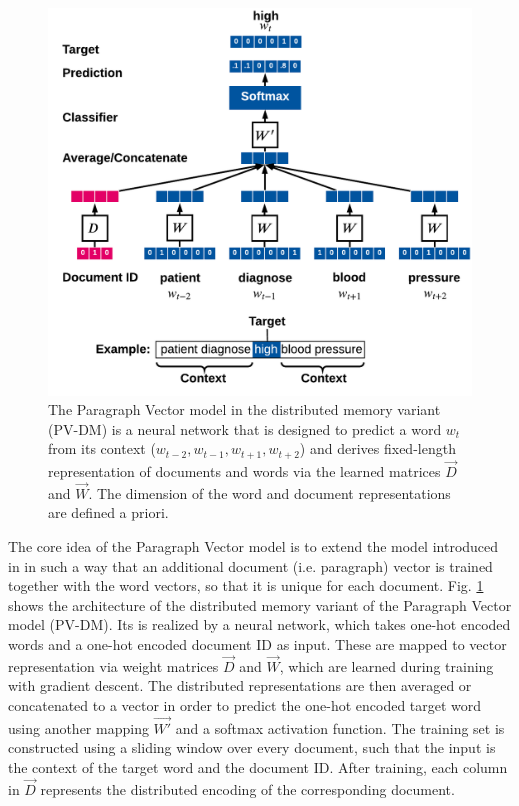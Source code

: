 \begin{figure}[!htbp]
	\centering
	\includegraphics[width=\textwidth]{figures/paragraph-vector}
	\caption[Paragraph Vector model]{The Paragraph Vector model in the distributed memory variant (PV-DM) is a neural network that is designed to predict a word $w_t$ from its context ($w_{t-2}, w_{t-1}, w_{t+1}, w_{t+2}$) and derives fixed-length representation of documents and words via the learned matrices $\vec{D}$ and $\vec{W}$. The dimension of the word and document representations are defined a priori.}
	\label{fig:paragraph-vector}
\end{figure}

The core idea of the Paragraph Vector model is to extend the model introduced in \cite{DBLP:journals/jmlr/BengioDVJ03} in such a way that an additional document (i.e. paragraph) vector is trained together with the word vectors, so that it is unique for each document.
Fig. \ref{fig:paragraph-vector} shows the architecture of the distributed memory variant of the Paragraph Vector model (PV-DM).
Its is realized by a neural network, which takes one-hot encoded words and a one-hot encoded document ID as input.
These are mapped to vector representation via weight matrices $\vec{D}$ and $\vec{W}$, which are learned during training with gradient descent.
The distributed representations are then averaged or concatenated to a vector in order to predict the one-hot encoded target word using another mapping $\vec{W'}$ and a softmax activation function.
The training set is constructed using a sliding window over every document, such that the input is the context of the target word and the document ID.
After training, each column in $\vec{D}$ represents the distributed encoding of the corresponding document.

